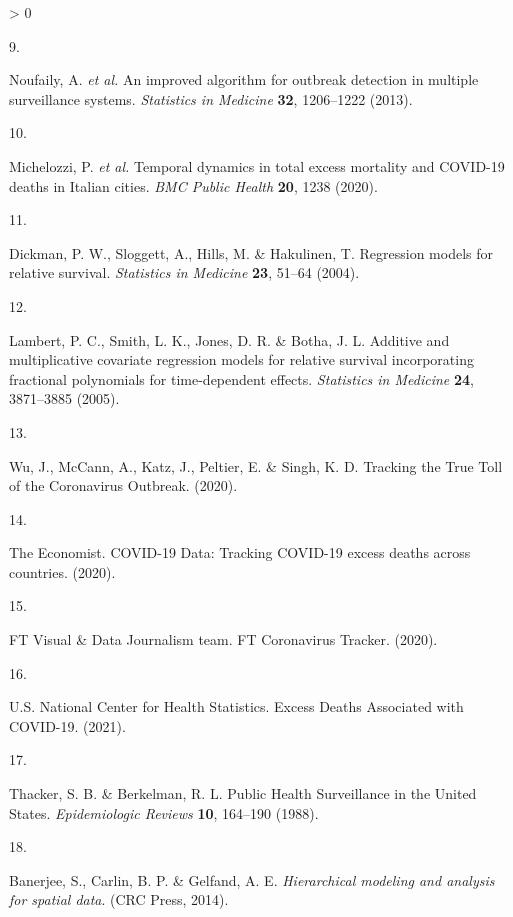 \documentclass[
]{article}
\newlength{\cslhangindent}
\newlength{\csllabelwidth}
\newenvironment{CSLReferences}[2] %
 {%
  \setlength{\parindent}{0pt}
  \ifodd #1 \everypar{\setlength{\hangindent}{\cslhangindent}}\ignorespaces\fi
  \ifnum #2 > 0
  \setlength{\parskip}{#2\baselineskip}
  \fi
 }%
 {}
\newcommand{\CSLLeftMargin}[1]{\parbox[t]{\csllabelwidth}{#1}}
\newcommand{\CSLRightInline}[1]{\parbox[t]{\linewidth - \csllabelwidth}{#1}\break}
\begin{document}
\begin{CSLReferences}{0}{0}
\leavevmode\hypertarget{ref-Noufaily2013}{}%
\CSLLeftMargin{9. }
\CSLRightInline{Noufaily, A. \emph{et al.} {An improved algorithm for outbreak detection in multiple surveillance systems}. \emph{Statistics in Medicine} \textbf{32}, 1206--1222 (2013).}

\leavevmode\hypertarget{ref-Michelozzi2020}{}%
\CSLLeftMargin{10. }
\CSLRightInline{Michelozzi, P. \emph{et al.} {Temporal dynamics in total excess mortality and COVID-19 deaths in Italian cities}. \emph{BMC Public Health} \textbf{20}, 1238 (2020).}

\leavevmode\hypertarget{ref-Dickman2004}{}%
\CSLLeftMargin{11. }
\CSLRightInline{Dickman, P. W., Sloggett, A., Hills, M. \& Hakulinen, T. {Regression models for relative survival}. \emph{Statistics in Medicine} \textbf{23}, 51--64 (2004).}

\leavevmode\hypertarget{ref-Lambert2005}{}%
\CSLLeftMargin{12. }
\CSLRightInline{Lambert, P. C., Smith, L. K., Jones, D. R. \& Botha, J. L. {Additive and multiplicative covariate regression models for relative survival incorporating fractional polynomials for time-dependent effects}. \emph{Statistics in Medicine} \textbf{24}, 3871--3885 (2005).}

\leavevmode\hypertarget{ref-Wu2020}{}%
\CSLLeftMargin{13. }
\CSLRightInline{Wu, J., McCann, A., Katz, J., Peltier, E. \& Singh, K. D. {Tracking the True Toll of the Coronavirus Outbreak}. (2020).}

\leavevmode\hypertarget{ref-TheEconomist2020}{}%
\CSLLeftMargin{14. }
\CSLRightInline{The Economist. {COVID-19 Data: Tracking COVID-19 excess deaths across countries}. (2020).}

\leavevmode\hypertarget{ref-FTVisualux5cux26DataJournalismteam2020}{}%
\CSLLeftMargin{15. }
\CSLRightInline{FT Visual \& Data Journalism team. {FT Coronavirus Tracker}. (2020).}

\leavevmode\hypertarget{ref-U.S.NationalCenterforHealthStatistics2021}{}%
\CSLLeftMargin{16. }
\CSLRightInline{U.S. National Center for Health Statistics. {Excess Deaths Associated with COVID-19}. (2021).}

\leavevmode\hypertarget{ref-Thacker1988}{}%
\CSLLeftMargin{17. }
\CSLRightInline{Thacker, S. B. \& Berkelman, R. L. {Public Health Surveillance in the United States}. \emph{Epidemiologic Reviews} \textbf{10}, 164--190 (1988).}

\leavevmode\hypertarget{ref-Banerjee2014}{}%
\CSLLeftMargin{18. }
\CSLRightInline{Banerjee, S., Carlin, B. P. \& Gelfand, A. E. \emph{{Hierarchical modeling and analysis for spatial data}}. (CRC Press, 2014).}


\end{CSLReferences}
\end{document}
